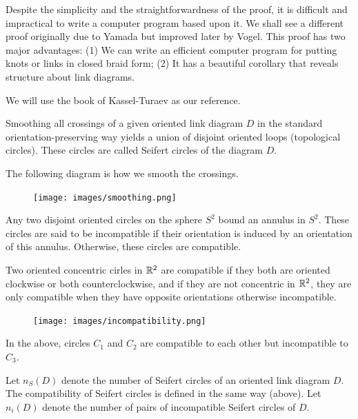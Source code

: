 Despite the simplicity and the straightforwardness of the proof, it is difficult and impractical to write a computer program based upon it. We shall see a different proof originally due to Yamada but improved later by Vogel. This proof has two major advantages: (1) We can write an efficient computer program for putting knots or links in closed braid form; (2) It has a beautiful corollary that reveals structure about link diagrams.

We will use the book of Kassel-Turaev \cite{kassel2008braid} as our reference.

\begin{definition}
\label{sec:artin-braid-group-8}
Smoothing all crossings of a given oriented link diagram $D$ in the standard orientation-preserving way yields a union of disjoint oriented loops (topological circles). These circles are called Seifert circles of the diagram $D$.
\end{definition}

The following diagram is how we smooth the crossings.

\begin{figure}[h]
  \centering
  \texttt{[image: images/smoothing.png]}
\end{figure}

\begin{definition}
\label{sec:artin-braid-group-9}
Any two disjoint oriented circles on the sphere $S^2$ bound an annulus in $S^2$. These circles are said to be incompatible if their orientation is induced by an orientation of this annulus. Otherwise, these circles are compatible.
\end{definition}

\begin{remark}
Two oriented concentric cirles in $\mathbb{R}^2$ are compatible if they both are oriented clockwise or both counterclockwise, and if they are not concentric in $\mathbb{R}^2$, they are only compatible when they have opposite orientations otherwise incompatible.
\end{remark}

\begin{figure}[h]
  \centering
  \texttt{[image: images/incompatibility.png]}
\end{figure}

In the above, circles $C_1$ and $C_2$ are compatible to each other but incompatible to $C_3$.

Let $n_S(D)$ denote the number of Seifert circles of an oriented link diagram $D$. The compatibility of Seifert circles is defined in the same way (above). Let $n_{i}(D)$ denote the number of pairs of incompatible Seifert circles of $D$.


